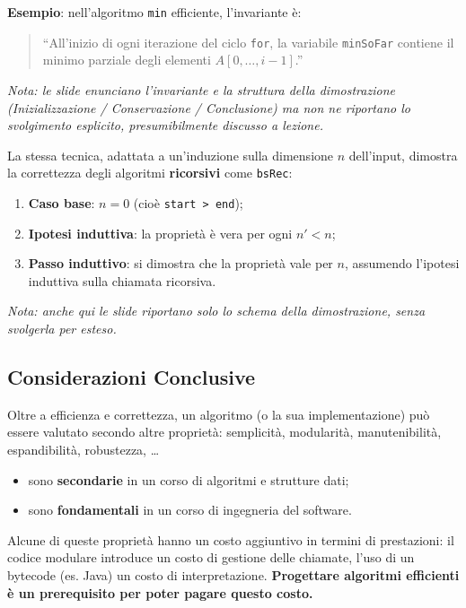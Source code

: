 \documentclass[12pt, a4paper]{article}
\begin{document}
\textbf{Esempio}: nell'algoritmo \texttt{min} efficiente, l'invariante è:
\begin{quote}
``All'inizio di ogni iterazione del ciclo \texttt{for}, la variabile \texttt{minSoFar} contiene il minimo parziale degli elementi $A[0,\dots,i-1]$.''
\end{quote}
\textit{Nota: le slide enunciano l'invariante e la struttura della dimostrazione (Inizializzazione / Conservazione / Conclusione) ma non ne riportano lo svolgimento esplicito, presumibilmente discusso a lezione.}

La stessa tecnica, adattata a un'induzione sulla dimensione $n$ dell'input, dimostra la correttezza degli algoritmi \textbf{ricorsivi} come \texttt{bsRec}:
\begin{enumerate}
    \item \textbf{Caso base}: $n=0$ (cioè \texttt{start > end});
    \item \textbf{Ipotesi induttiva}: la proprietà è vera per ogni $n' < n$;
    \item \textbf{Passo induttivo}: si dimostra che la proprietà vale per $n$, assumendo l'ipotesi induttiva sulla chiamata ricorsiva.
\end{enumerate}
\textit{Nota: anche qui le slide riportano solo lo schema della dimostrazione, senza svolgerla per esteso.}

\subsection{Considerazioni Conclusive}

Oltre a efficienza e correttezza, un algoritmo (o la sua implementazione) può essere valutato secondo altre proprietà: semplicità, modularità, manutenibilità, espandibilità, robustezza, \dots
\begin{itemize}
    \item sono \textbf{secondarie} in un corso di algoritmi e strutture dati;
    \item sono \textbf{fondamentali} in un corso di ingegneria del software.
\end{itemize}

\begin{tcolorbox}[colback=lightergray!10, colframe=tocsec, title=\textbf{Osservazione}]
Alcune di queste proprietà hanno un costo aggiuntivo in termini di prestazioni: il codice modulare introduce un costo di gestione delle chiamate, l'uso di un bytecode (es. Java) un costo di interpretazione. \textbf{Progettare algoritmi efficienti è un prerequisito per poter pagare questo costo.}
\end{tcolorbox}
\end{document}
